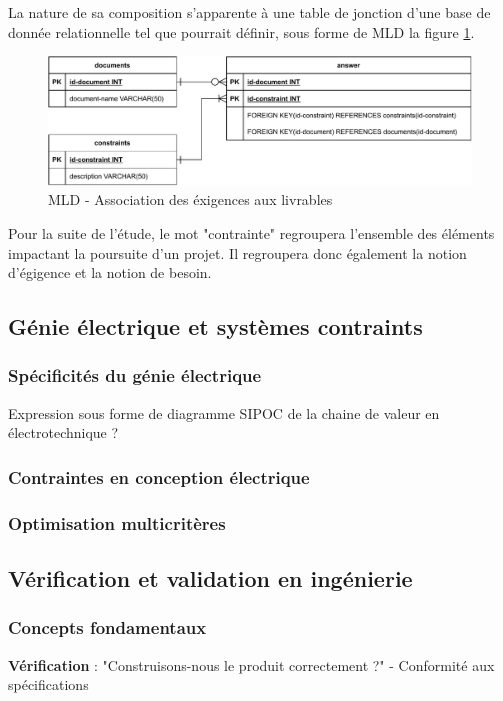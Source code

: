 \documentclass[a4paper,12pt]{article}
\begin{document}
La nature de sa composition s'apparente à une table de jonction d'une base de donnée relationnelle tel que pourrait définir, sous forme de MLD la figure \ref{fig:org78ba979}.

\begin{figure}[htbp]
\centering
\includegraphics[width=.9\linewidth]{./svg/db-exigences-lde.pdf}
\caption{\label{fig:org78ba979}MLD - Association des éxigences aux livrables}
\end{figure}

Pour la suite de l'étude, le mot "contrainte" regroupera l'ensemble des éléments impactant la poursuite d'un projet. Il regroupera donc également la notion d'égigence et la notion de besoin.
\subsection{Génie électrique et systèmes contraints}
\label{sec:org1e2c2f0}
\subsubsection{Spécificités du génie électrique}
\label{sec:orga924b67}
Expression sous forme de diagramme SIPOC de la chaine de valeur en électrotechnique ?
\subsubsection{Contraintes en conception électrique}
\label{sec:org57ba31d}
\subsubsection{Optimisation multicritères}
\label{sec:org1ccf9a3}
\subsection{Vérification et validation en ingénierie}
\label{sec:org6667464}
\subsubsection{Concepts fondamentaux}
\label{sec:orgd26b8f9}
\textbf{Vérification} : "Construisons-nous le produit correctement ?" - Conformité aux spécifications
\end{document}
